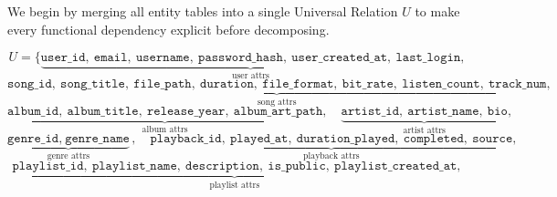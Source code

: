 \documentclass[12pt, a4paper]{article}
\newcommand{\attr}[1]{\texttt{#1}}
\begin{document}
We begin by merging all entity tables into a single Universal Relation $U$ to make every
functional dependency explicit before decomposing.

\[
U = \Big\{
\underbrace{\attr{user\_id},\ \attr{email},\ \attr{username},\ \attr{password\_hash},\ \attr{user\_created\_at},\ \attr{last\_login}}_{\text{user attrs}},
\]
\[
\underbrace{\attr{song\_id},\ \attr{song\_title},\ \attr{file\_path},\ \attr{duration},\ \attr{file\_format},\ \attr{bit\_rate},\ \attr{listen\_count},\ \attr{track\_num}}_{\text{song attrs}},
\]
\[
\underbrace{\attr{album\_id},\ \attr{album\_title},\ \attr{release\_year},\ \attr{album\_art\_path}}_{\text{album attrs}},\quad
\underbrace{\attr{artist\_id},\ \attr{artist\_name},\ \attr{bio}}_{\text{artist attrs}},
\]
\[
\underbrace{\attr{genre\_id},\ \attr{genre\_name}}_{\text{genre attrs}},\quad
\underbrace{\attr{playback\_id},\ \attr{played\_at},\ \attr{duration\_played},\ \attr{completed},\ \attr{source}}_{\text{playback attrs}},
\]
\[
\underbrace{\attr{playlist\_id},\ \attr{playlist\_name},\ \attr{description},\ \attr{is\_public},\ \attr{playlist\_created\_at}}_{\text{playlist attrs}},
\]
\end{document}
